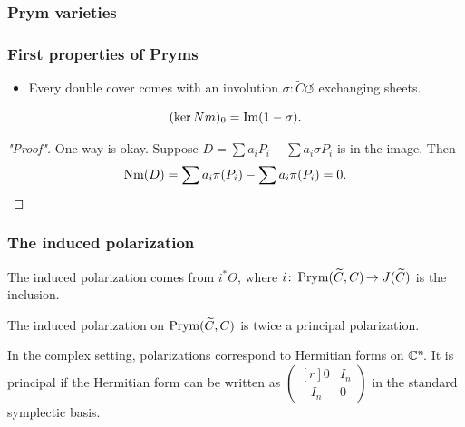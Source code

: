 \begin{frame}
\frametitle{Prym varieties}



\end{frame}


\begin{frame}
\frametitle{First properties of Pryms}

\begin{itemize}
	\item Every double cover comes with an involution $\sigma \colon  \widetilde C \circlearrowleft$ exchanging sheets.
\end{itemize}


\begin{proposition}
\[
(\ker Nm)_0 = \operatorname{Im}(1-\sigma).
\]
\end{proposition}
\begin{proof}["Proof"]
One way is okay. Suppose $D= \sum a_i P_i - \sum a_i \sigma{P_i}$ is in the image. Then
\[
\operatorname{Nm}(D) = \sum a_i \pi(P_i) - \sum a_i \pi(P_i) = 0.
\]
\end{proof}
\end{frame}

\begin{frame}
\frametitle{The induced polarization}

The induced polarization comes from \alert{$i^\ast \Theta$}, where $i\colon\operatorname{Prym}(\widetilde C, C )\mkern-2mu \to J(\widetilde C)$ is the inclusion.

\begin{theorem}
The induced polarization on $\operatorname{Prym}(\widetilde C, C)$ is twice a principal polarization.
\end{theorem}
\pause
\begin{remark}
In the complex setting, polarizations correspond to Hermitian forms on $\mathbb{C}^n\mkern-3mu$. It is principal if the Hermitian form can be written as $
\begin{pmatrix*}[r]
0 & I_n \\
-I_n &0
\end{pmatrix*}$
in the standard symplectic basis.
\end{remark}
\end{frame}


